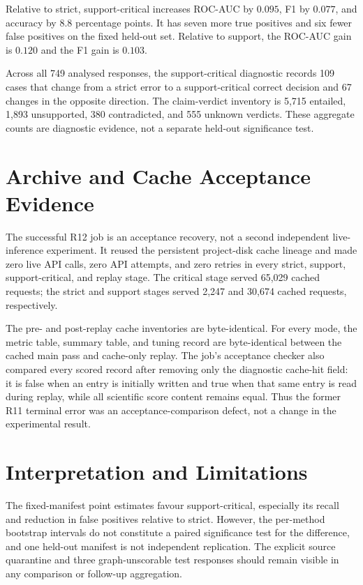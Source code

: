 \documentclass[11pt,a4paper]{article}
\begin{document}
Relative to strict, support-critical increases ROC-AUC by $0.095$, F1 by $0.077$, and accuracy by $8.8$ percentage points.  It has seven more true positives and six fewer false positives on the fixed held-out set.  Relative to support, the ROC-AUC gain is $0.120$ and the F1 gain is $0.103$.

Across all 749 analysed responses, the support-critical diagnostic records 109 cases that change from a strict error to a support-critical correct decision and 67 changes in the opposite direction.  The claim-verdict inventory is 5,715 entailed, 1,893 unsupported, 380 contradicted, and 555 unknown verdicts.  These aggregate counts are diagnostic evidence, not a separate held-out significance test.

\section{Archive and Cache Acceptance Evidence}
The successful R12 job is an acceptance recovery, not a second independent live-inference experiment.  It reused the persistent project-disk cache lineage and made zero live API calls, zero API attempts, and zero retries in every strict, support, support-critical, and replay stage.  The critical stage served 65,029 cached requests; the strict and support stages served 2,247 and 30,674 cached requests, respectively.

The pre- and post-replay cache inventories are byte-identical.  For every mode, the metric table, summary table, and tuning record are byte-identical between the cached main pass and cache-only replay.  The job's acceptance checker also compared every scored record after removing only the diagnostic cache-hit field: it is false when an entry is initially written and true when that same entry is read during replay, while all scientific score content remains equal.  Thus the former R11 terminal error was an acceptance-comparison defect, not a change in the experimental result.

\section{Interpretation and Limitations}
The fixed-manifest point estimates favour support-critical, especially its recall and reduction in false positives relative to strict.  However, the per-method bootstrap intervals do not constitute a paired significance test for the difference, and one held-out manifest is not independent replication.  The explicit source quarantine and three graph-unscorable test responses should remain visible in any comparison or follow-up aggregation.
\end{document}
